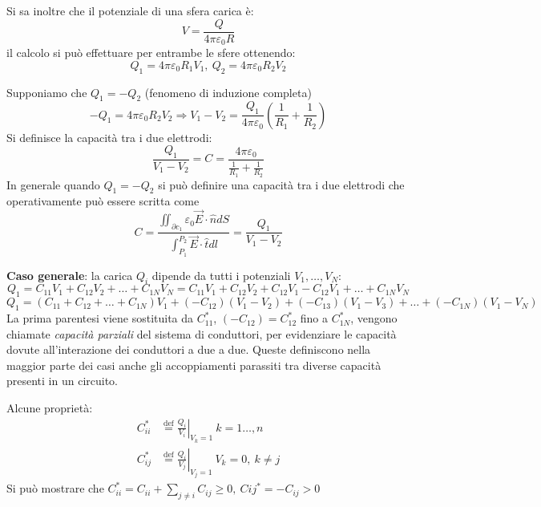 Si sa inoltre che il potenziale di una sfera carica è:
$$
V = \frac{Q}{4 \pi \varepsilon_0 R}
$$
il calcolo si può effettuare per entrambe le sfere ottenendo:
$$
Q_1 = 4 \pi \varepsilon_0 R_1 V_1,\ Q_2 = 4 \pi \varepsilon_0 R_2 V_2
$$

Supponiamo che $Q_1 = -Q_2$ (fenomeno di induzione completa)
$$
-Q_1 = 4 \pi \varepsilon_0 R_2 V_2 \Rightarrow V_1 - V_2 = \frac{Q_1}{4 \pi \varepsilon_0}
\left(\frac{1}{R_1} + \frac{1}{R_2}\right)
$$
Si definisce la capacità tra i due elettrodi:
$$
\frac{Q_1}{V_1 - V_2} = C = \frac{4 \pi \varepsilon_0}{\frac{1}{R_1}+\frac{1}{R_2}}
$$
In generale quando $Q_1 = - Q_2$ si può definire una capacità tra i due elettrodi che operativamente
può essere scritta come 
$$
C = \frac{\iint_{\partial c_1} \varepsilon_0 \vec{E}\cdot\hat{n}dS} {\int_{P_1}^{P_2}\vec{E}\cdot\hat{t} dl} = \frac{Q_1}{V_1 - V_2}
$$


\textbf{Caso generale}: la carica $Q_i$ dipende da tutti i potenziali $V_1, \ldots ,V_N$:
$$
Q_1 = C_{11}V_1 + C_{12}V_2 + \ldots + C_{1N}V_N = C_{11}V_1 + C_{12}V_2 + C_{12}V_1 - C_{12} V_1 +
\ldots  + C_{1N}V_N
$$
$$
Q_1 = \left(C_{11}+C_{12} + \ldots + C_{1N}\right) V_1 + (-C_{12})(V_1-V_2) + (-C_{13})(V_1-V_3)
+ \ldots + (-C_{1N})(V_1-V_N)
$$
La prima parentesi viene sostituita da $C_{11}^*$, $(-C_{12}) = C_{12}^*$ fino a $C_{1N}^*$,
vengono chiamate
\textit{capacità parziali} del sistema di conduttori, per evidenziare le capacità 
dovute all'interazione dei conduttori a due a due.
Queste definiscono nella maggior parte dei casi anche gli accoppiamenti parassiti
tra diverse capacità presenti in un circuito.

Alcune proprietà:
$$\begin{aligned}
C_{ii}^* &\stackrel{\text{def}}{=} \left.\frac{Q_i}{V_i}\right|_{V_k = 1}\ k=1\ldots ,n\\
C_{ij}^* &\stackrel{\text{def}}{=} \left.\frac{Q_i}{V_j}\right|_{V_j=1}\ V_k = 0,\ k \neq j
\end{aligned}
$$
Si può mostrare che $C_{ii}^* =C_{ii} + \sum_{j\neq i}C_{ij} \geq 0,\ C{ij}^* = -C_{ij} > 0$

